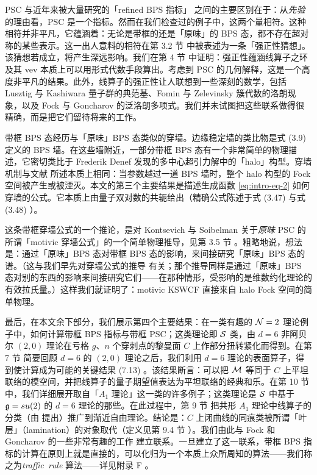 PSC 与近年来被大量研究的「refined BPS 指标」\cite{Gukov:2004hz,Diaconescu:2007bf,Dimofte:2009bv,Dimofte:2009tm} 之间的主要区别在于：从\emph{先验}的理由看，PSC 是一个指标。然而在我们检查过的例子中，这两个量相符。这种相符并非平凡，它蕴涵着：无论是带框的还是「原味」的 BPS 态，都不存在超对称的某些表示。这一出人意料的相符在第 3.2 节%
中被表述为一条「强正性猜想」。该猜想若成立，将产生深远影响。我们在第 4 节%
中证明：强正性蕴涵线算子之环及其 vev 本质上可以用形式代数手段算出。考虑到 PSC 的几何解释，这是一个高度非平凡的结果。此外，线算子的强正性让人联想到一些深刻的数学，包括 Lusztig 与 Kashiwara 量子群的典范基、Fomin 与 Zelevinsky 簇代数的洛朗现象，以及 Fock 与 Goncharov 的泛洛朗多项式。我们并未试图把这些联系做得很精确，而是把它们留待将来的工作。

带框 BPS 态经历与「原味」BPS 态类似的穿墙。边缘稳定墙的类比物是式 (3.9)%
定义的 BPS 墙。在这些墙附近，一部分带框 BPS 态有一个非常简单的物理描述，它密切类比于 Frederik Denef 发现的多中心超引力解中的「halo」构型。穿墙机制与文献 \cite{Denef:2007vg} 所述本质上相同：当参数越过一道 BPS 墙时，整个 halo 构型的 Fock 空间被产生或被湮灭。本文的第三个主要结果是描述生成函数 \eqref{eq:intro-eq-2} 如何穿墙的公式。它本质上由量子双对数的共轭给出（精确公式陈述于式 (3.47) 与式 (3.48)%
）。

这条带框穿墙公式的一个推论，是对 Kontsevich 与 Soibelman 关于\emph{原味} PSC 的所谓「motivic 穿墙公式」的一个简单物理推导，见第 3.5 节%
。粗略地说，想法是：通过「原味」BPS 态对带框 BPS 态的影响，来间接研究「原味」BPS 态的谱。（这与我们早先对穿墙公式的推导\cite{Gaiotto:2008cd} 有关；那个推导同样是通过「原味」BPS 态对别的东西的影响来间接研究它们——在那种情形，受影响的是维数约化理论的有效拉氏量。）这样我们就证明了：motivic KSWCF 直接来自 halo Fock 空间的简单物理。

最后，在本文余下部分，我们展示第四个主要结果：在一类有趣的 $\mathcal{N}=2$ 理论例子中，如何计算带框 BPS 指标与带框 PSC；这类理论即 $\mathcal{S}$ 类，由 $d=6$ 非阿贝尔 $(2,0)$ 理论在亏格 $g$、$n$ 个穿刺点的黎曼面 $C$ 上作部分扭转紧化而得到\cite{Witten:1997sc,Gaiotto:2009we,Gaiotto:2009hg}。在第 7 节%
简要回顾 $d=6$ 的 $(2,0)$ 理论之后，我们利用 $d=6$ 理论的表面算子，得到使计算成为可能的关键结果 (7.13)%
。该结果断言：可以把 $\mathcal{M}$ 等同于 $C$ 上平坦联络的模空间，并把线算子的量子期望值表达为平坦联络的经典和乐。在第 10 节%
中，我们详细展开取自「$A_1$ 理论」这一类的许多例子；这类理论是 $\mathcal{S}$ 中基于 $\mathfrak{g}=su(2)$ 的 $d=6$ 理论的那些。在此过程中，第 9 节%
把共形 $A_1$ 理论中线算子的分类（由 \cite{Drukker:2009tz} 提出）推广到渐近自由理论。结论是：$C$ 上闭曲线的同痕类被所谓「叶层」（lamination）的对象取代（定义见第 9.4 节%
）。我们由此与 Fock 和 Goncharov 的一些非常有趣的工作\cite{MR2349682,MR2567745} 建立联系。一旦建立了这一联系，带框 BPS 指标的计算在原则上就是直接的，可以化归为一个本质上众所周知的算法——我们称之为\mbox{\emph{traffic rule}} 算法——详见附录 F%
。


